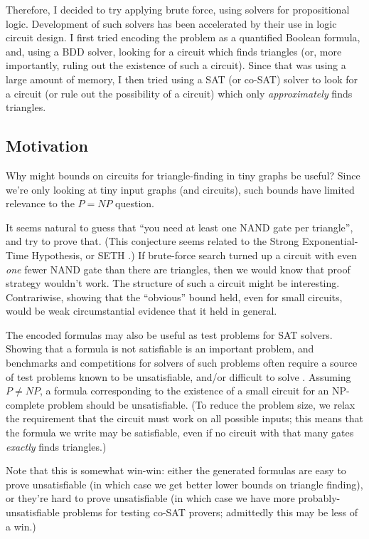 \documentclass[12pt]{article}
\begin{document}
Therefore, I decided to try applying brute force, using solvers for propositional
logic. Development of such solvers has been accelerated by their use in logic
circuit design.
I first tried encoding the problem
as a quantified Boolean formula, and, using a BDD solver,
looking for a circuit which finds
triangles (or, more importantly, ruling out
the existence of such a circuit). Since that was using a large amount of memory,
I then tried using a SAT (or co-SAT) solver to look
for a circuit (or rule out the possibility of a circuit)
which only {\em approximately} finds triangles.

\subsection{Motivation}

Why might bounds on circuits for triangle-finding in tiny graphs be useful? Since we're
only looking at tiny input graphs (and circuits), such bounds have
limited relevance to the $P=NP$ question.

It seems natural to guess that ``you need at least one NAND gate per triangle'',
and try to prove that.
(This conjecture seems related to the Strong Exponential-Time Hypothesis, or SETH \cite{impagliazzo_complexity_1999}.)
If brute-force search turned up a circuit with even {\em one}
fewer NAND gate than there are triangles, then we would know that proof strategy wouldn't work.
The structure of such a circuit might be interesting.
Contrariwise, showing that the ``obvious'' bound held, even for small circuits, would be
weak circumstantial evidence that it held in general.

The encoded formulas may also be useful as test problems for SAT solvers.
Showing that a formula is not satisfiable is an important problem, and
benchmarks and competitions for solvers of such
problems often require a source of
test problems known to be unsatisfiable, and/or difficult to solve \cite{toughsat}.
 Assuming $P \ne NP$,
a formula corresponding to the existence of a small circuit for an NP-complete
problem should be unsatisfiable. (To reduce the problem size, we relax the requirement
that the circuit must work on all possible inputs; this means that the formula we
write may be satisfiable, even if no circuit with that many gates {\em exactly}
finds triangles.)

Note that this is somewhat win-win: either the generated formulas are easy to
prove unsatisfiable (in which case we get better lower bounds on triangle finding),
or they're hard to prove unsatisfiable (in which case we have more probably-unsatisfiable
problems for testing co-SAT provers; admittedly this may be less of a win.)
\end{document}
